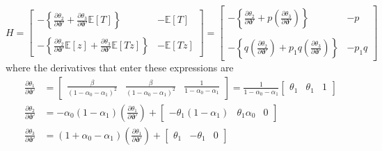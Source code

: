 \documentclass[12pt]{article}
\begin{document}
\[
  H = 
  \left[
  \begin{array}{cc}
    -\left\{ \displaystyle \frac{\partial \theta_2}{\partial \boldsymbol{\vartheta}'} +  \frac{\partial \theta_3}{\partial \boldsymbol{\vartheta}'} \mathbb{E}[T]\right\}& - \mathbb{E}[T] \\ \\
    -\left\{ \displaystyle \frac{\partial \theta_2}{\partial \boldsymbol{\vartheta}'} \mathbb{E}[z] +  \frac{\partial \theta_3}{\partial \boldsymbol{\vartheta}'} \mathbb{E}[Tz]\right\}& - \mathbb{E}[Tz] 
  \end{array}
\right] = 
  \left[
  \begin{array}{cc}
    -\left\{ \displaystyle \frac{\partial \theta_2}{\partial \boldsymbol{\vartheta}'} +  p\left(\frac{\partial \theta_3}{\partial \boldsymbol{\vartheta}'}\right) \right\}& -p \\ \\
    -\left\{ \displaystyle q\left(\frac{\partial \theta_2}{\partial \boldsymbol{\vartheta}'} \right) +  p_1 q\left(\frac{\partial \theta_3}{\partial \boldsymbol{\vartheta}'}\right) \right\}& -p_1 q
  \end{array}
\right]
\]
where the derivatives that enter these expressions are
\begin{align*}
  \frac{\partial \theta_1}{\partial \boldsymbol{\vartheta}'} &= \left[
  \begin{array}{ccc}
    \displaystyle \frac{\beta}{(1 - \alpha_0 - \alpha_1)^2} &
    \displaystyle \frac{\beta}{(1 - \alpha_0 - \alpha_1)^2} &
    \displaystyle \frac{1}{1 - \alpha_0 - \alpha_1}
  \end{array}
\right] =\frac{1}{1 - \alpha_0 - \alpha_1} \left[
\begin{array}{ccc}
  \theta_1 & \theta_1 & 1
\end{array}
\right]\\
  \frac{\partial \theta_2}{\partial \boldsymbol{\vartheta}'} &= 
  -\alpha_0(1 - \alpha_1) \left( \frac{\partial \theta_1}{\partial \boldsymbol{\vartheta}'} \right) + \left[
  \begin{array}{ccc}
    -\theta_1(1 - \alpha_1) &
    \theta_1 \alpha_0 & 
    0
  \end{array}
\right]\\
  \frac{\partial \theta_3}{\partial \boldsymbol{\vartheta}'} &= (1 + \alpha_0 - \alpha_1) \left( \frac{\partial \theta_1}{\partial \boldsymbol{\vartheta}'} \right) + \left[
  \begin{array}{ccc}
    \theta_1 & - \theta_1 & 0
  \end{array}
\right]
\end{align*}
\end{document}
